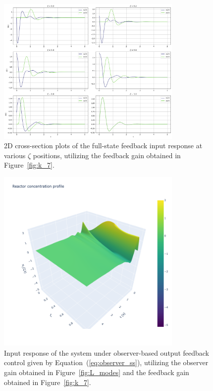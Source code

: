 \begin{figure}[!htbp]
    \centering
    \includegraphics[width=0.8\textwidth]{Figures/2D_xt_k7.png}
    \caption{2D cross-section plots of the full-state feedback input response at various $\zeta$ positions, utilizing the feedback gain obtained in Figure~\ref{fig:k_7}.}
    \label{fig:2D_xt_k7}
\end{figure}

\begin{figure}[!htbp]
    \centering
    \includegraphics[width=0.8\textwidth,trim=0 0 100 0,clip]{Figures/3D_x1_L_k7.png}
    \caption{Input response of the system under observer-based output feedback control given by Equation~(\ref{eq:observer_ss}), utilizing the observer gain obtained in Figure~\ref{fig:L_modes} and the feedback gain obtained in Figure~\ref{fig:k_7}.}
    \label{fig:3D_x1_L_k7}
\end{figure}

